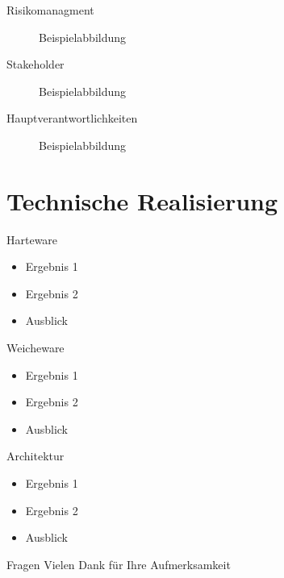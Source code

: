 \documentclass[aspectratio=169]{beamer}
\begin{document}
	\begin{frame}{Risikomanagment}
		\begin{figure}
			\centering
			\caption{Beispielabbildung}
		\end{figure}
	\end{frame}
	
	\begin{frame}{Stakeholder}
		\begin{figure}
			\centering
			\caption{Beispielabbildung}
		\end{figure}
	\end{frame}
	
	\begin{frame}{Hauptverantwortlichkeiten}
		\begin{figure}
			\centering
			\caption{Beispielabbildung}
		\end{figure}
	\end{frame}
	\section{Technische Realisierung}
	
	\begin{frame}{Harteware}
		\begin{itemize}
			\item Ergebnis 1
			\item Ergebnis 2
			\item Ausblick
		\end{itemize}
	\end{frame}
	
	\begin{frame}{Weicheware}
		\begin{itemize}
			\item Ergebnis 1
			\item Ergebnis 2
			\item Ausblick
		\end{itemize}
	\end{frame}
	
	\begin{frame}{Architektur}
		\begin{itemize}
			\item Ergebnis 1
			\item Ergebnis 2
			\item Ausblick
		\end{itemize}
	\end{frame}
	
	\begin{frame}{Fragen}
		\centering
		\Huge Vielen Dank für Ihre Aufmerksamkeit
	\end{frame}
	
\end{document}
